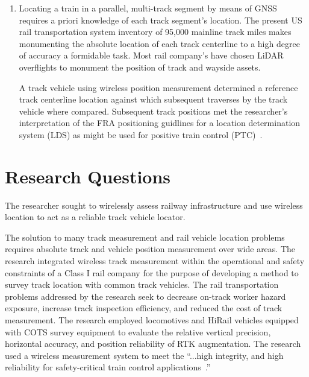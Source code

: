\begin{enumerate}
	\item Locating a train in a parallel, multi-track segment by means of GNSS requires a priori knowledge of each track segment's location. The present US rail transportation system inventory of 95,000 mainline track miles makes monumenting the absolute location of each track centerline to a high degree of accuracy a formidable task. Most rail company's have chosen LiDAR overflights to monument the position of track and wayside assets.
	
	A track vehicle using wireless position measurement determined a reference track centerline location against which subsequent traverses by the track vehicle where compared. Subsequent track positions met the researcher's interpretation of the FRA positioning guidlines for a location determination system (LDS) as might be used for positive train control (PTC)~\citep[pp.3]{1995FRADiffe}.

\end{enumerate}  


\section{Research Questions}
The researcher sought to wirelessly assess railway infrastructure and use wireless location to act as a reliable track vehicle locator. 

The solution to many track measurement and rail vehicle location problems requires absolute track and vehicle position measurement over wide areas. The research integrated wireless track measurement within the operational and safety constraints of a Class I rail company for the purpose of developing a method to survey track location with common track vehicles. The rail transportation problems addressed by the research seek to decrease on-track worker hazard exposure, increase track inspection efficiency, and reduced the cost of track measurement. The research employed locomotives and HiRail vehicles equipped with COTS survey equipment to evaluate the relative vertical precision, horizontal accuracy, and position reliability of RTK augmentation. The research used a wireless measurement system to meet the ``...high integrity, and high reliability for safety-critical train control applications~\citep[pp.11]{2008USDoT_NDGPS}.''

